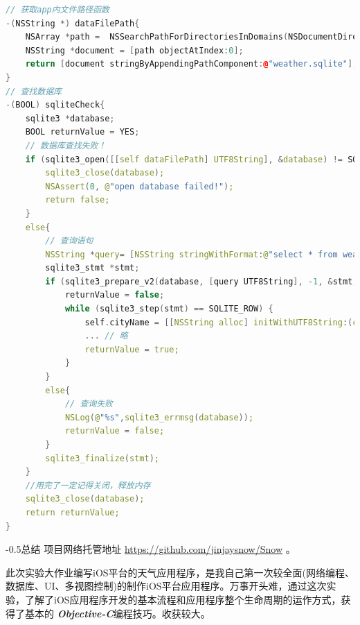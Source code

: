 \documentclass[UTF8,nofonts]{ctexart}
\makeatletter
\renewcommand{\section}{\@startsection{section}{1}{0mm}
  {-\baselineskip}{0.5\baselineskip}{\fontsize{16pt}{16pt}\bf\leftline}}
\makeatother
\begin{document}
\begin{lstlisting}[language={C++}]
// 获取app内文件路径函数
-(NSString *) dataFilePath{
    NSArray *path =  NSSearchPathForDirectoriesInDomains(NSDocumentDirectory, NSUserDomainMask, YES);
    NSString *document = [path objectAtIndex:0];
    return [document stringByAppendingPathComponent:@"weather.sqlite"];
}
// 查找数据库
-(BOOL) sqliteCheck{
    sqlite3 *database;
    BOOL returnValue = YES;
    // 数据库查找失败！
    if (sqlite3_open([[self dataFilePath] UTF8String], &database) != SQLITE_OK) {
        sqlite3_close(database);
        NSAssert(0, @"open database failed!");
        return false;
    }
    else{
    	// 查询语句
        NSString *query= [NSString stringWithFormat:@"select * from weather where cityName = '%@'", [CityTableViewController getCurrentCity]];
        sqlite3_stmt *stmt;
        if (sqlite3_prepare_v2(database, [query UTF8String], -1, &stmt, nil) == SQLITE_OK) {
            returnValue = false;
            while (sqlite3_step(stmt) == SQLITE_ROW) {
                self.cityName = [[NSString alloc] initWithUTF8String:(char*)sqlite3_column_text(stmt, 1-1)];
                ... // 略
                returnValue = true;
            }
        }
        else{
        	// 查询失败
            NSLog(@"%s",sqlite3_errmsg(database));
            returnValue = false;
        }
        sqlite3_finalize(stmt);
    }
    //用完了一定记得关闭，释放内存
    sqlite3_close(database);
    return returnValue;
}
\end{lstlisting}

\section{总结} 
\label{sec:总结_}
项目网络托管地址 \url{https://github.com/jinjaysnow/Snow} 。

此次实验大作业编写iOS平台的天气应用程序，是我自己第一次较全面(网络编程、数据库、UI、多视图控制)的制作iOS平台应用程序。万事开头难，通过这次实验，了解了iOS应用程序开发的基本流程和应用程序整个生命周期的运作方式，获得了基本的 \textit{\textbf{Objective-C}}编程技巧。收获较大。
\end{document}
